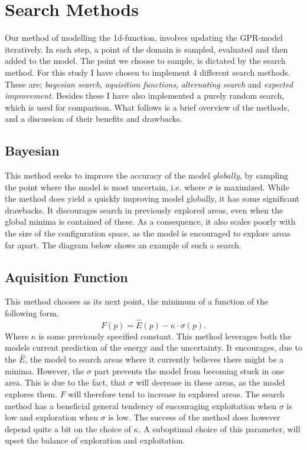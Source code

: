 \documentclass[working, oneside]{../../Preambles/tuftebook}
\begin{document}
\section*{Search Methods}
Our method of modelling the 1d-function, involves updating the GPR-model iteratively. In each step, a point of the domain is sampled, evaluated and then added to the model. The point we choose to sample, is dictated by the search method. For this study I have chosen to implement 4 different search methods. These are; \textit{bayesian search}, \textit{aquisition functions}, \textit{alternating search} and \textit{expected improvement}. Besides these I have also implemented a purely random search, which is used for comparison. What follows is a brief overview of the methods, and a discussion of their benefits and drawbacks.
\subsection*{Bayesian}
This method seeks to improve the accuracy of the model \textit{globally}, by sampling the point where the model is most uncertain, i.e. where $\sigma$ is maximized. While the method does yield a quickly improving model globally, it has some significant drawbacks. It discourages search in previously explored areas, even when the global minima is contained of these. As a consequence, it also scales poorly with the size of the configuration space, as the model is encouraged to explore areas far apart. The diagram below shows an example of such a search.
\subsection*{Aquisition Function}
This method chooses as its next point, the minimum of a function of the following form,
\[
F(p) = \hat{E}(p) - \kappa \cdot \sigma\left( p \right) 
.\] 
Where $\kappa$ is some previously specified constant. This method leverages both the models current prediction of the energy and the uncertainty. It encourages, due to the $\hat{E}$, the model to search areas where it currently believes there might be a minima. However, the $\sigma$ part prevents the model from becoming stuck in one area. This is due to the fact, that $\sigma$ will decrease in these areas, as the model explores them. $F$ will therefore tend to increase in explored areas. The search method has a beneficial general tendency of encouraging exploitation when  $\sigma$ is low and exploration when $\sigma$ is low. The success of the method does however depend quite a bit on the choice of $\kappa$. A suboptimal choice of this parameter, will upset the balance of exploration and exploitation.
\end{document}
